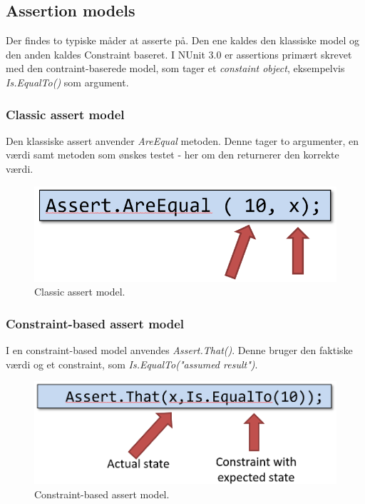 
\subsection{Assertion models}
Der findes to typiske måder at asserte på. Den ene kaldes den klassiske model og den anden kaldes Constraint baseret. I NUnit 3.0 er assertions primært skrevet med den contraint-baserede model, som tager et \textit{constaint object}, eksempelvis \textit{Is.EqualTo()} som argument.

\subsubsection{Classic assert model}

Den klassiske assert anvender \textit{AreEqual} metoden. Denne tager to argumenter, en værdi samt metoden som ønskes testet - her om den returnerer den korrekte værdi.

\begin{figure}[H]
\centering
\includegraphics[width=0.4\linewidth]{figs/classicAssert.PNG}
\caption{Classic assert model.}
\label{fig:classicAssert}
\end{figure}

\subsubsection{Constraint-based assert model}
I en constraint-based model anvendes \textit{Assert.That()}. Denne bruger den faktiske værdi og et constraint, som \textit{Is.EqualTo("assumed result")}.

\begin{figure}[H]
\centering
\includegraphics[width=0.5\linewidth]{figs/constraintAssert}
\caption{Constraint-based assert model.}
\label{fig:constraintassert}
\end{figure}





































